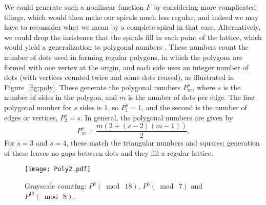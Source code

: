 \documentclass{article}
\theoremstyle{definition}
\def\pmod#1{(\bmod\  #1)}
\begin{document}
We could generate such a nonlinear function $F$ by considering more
complicated tilings, which would then make our spirals much less
regular, and indeed we may have to reconsider what we mean by a
complete spiral in that case.  Alternatively, we could drop the
insistence that the spirals fill in each point of the lattice, which
would yield a generalization to polygonal numbers \cite{Polyg}.  These numbers
count the number of dots used in forming regular polygons, in which
the polygons are formed with one vertex at the origin, and each side
uses an integer number of dots (with vertices counted twice and some
dots reused), as illustrated in Figure~\ref{fig:poly}.  These generate
the polygonal numbers $P^s_m$, where $s$ is the number of sides in
the polygon, and $m$ is the number of dots per edge.  The first
polygonal number for $s$ sides is 1, so $P^s_1=1$, and the second is
the number of edges or vertices, $P^s_2=s$.  In general, the
polygonal numbers are given by
\[
  P^s_m = \frac{m(2+(s-2)(m-1))}2.
\]
For $s=3$ and $s=4$, these match the triangular numbers and squares;
generation of these leaves no gaps between dots and they fill a
regular lattice.

\begin{figure}[htb]
  \centering
  \texttt{[image: Poly2.pdf]}
  \caption{Grayscale counting: $P^8\pmod{18}$, $P^5\pmod7$ and $P^{10}\pmod8$.}
  \label{fig:poly2}
\end{figure}
\end{document}
